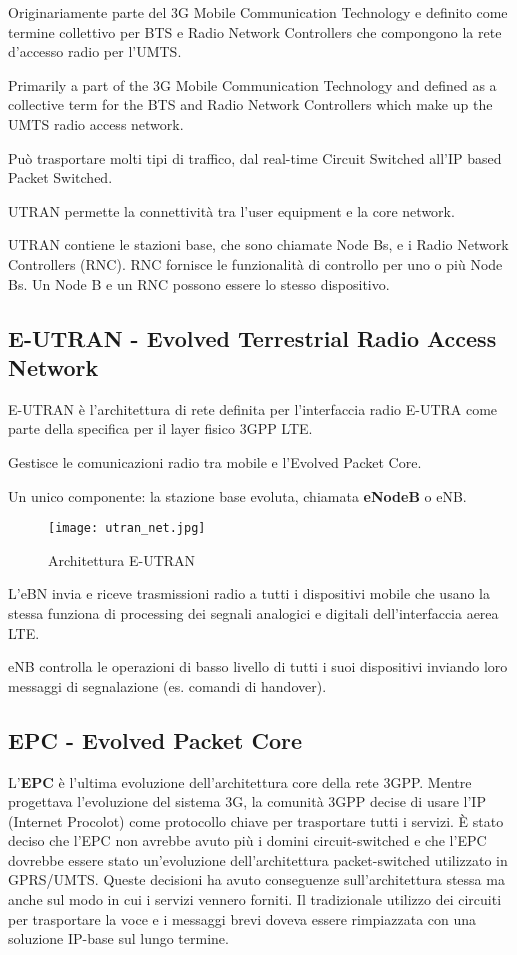 Originariamente parte del 3G Mobile Communication Technology e definito come 
termine collettivo per BTS e Radio Network Controllers che compongono la rete 
d'accesso radio per l'UMTS.

Primarily a part of the 3G Mobile Communication Technology and defined as a
collective term for the BTS and Radio Network Controllers which make up the
UMTS radio access network.

Può trasportare molti tipi di traffico, dal real-time Circuit Switched all'IP 
based Packet Switched.

UTRAN permette la connettività tra l'user equipment e la core network.

UTRAN contiene le stazioni base, che sono chiamate Node Bs, e i Radio
Network Controllers (RNC).
RNC fornisce le funzionalità di controllo per uno o più Node Bs.
Un Node B e un RNC possono essere lo stesso dispositivo.

\subsection{E-UTRAN - Evolved Terrestrial Radio Access Network}

E-UTRAN è l'architettura di rete definita per l'interfaccia radio E-UTRA 
come parte della specifica per il layer fisico 3GPP LTE.

Gestisce le comunicazioni radio tra mobile e l'Evolved Packet Core.

Un unico componente: la stazione base evoluta, chiamata \textbf{eNodeB} o eNB.

\begin{figure}[H]
  \centering
  \texttt{[image: utran\_net.jpg]}
  \caption{Architettura E-UTRAN}
  \label{fig:utran_net}
\end{figure}

L'eBN invia e riceve trasmissioni radio a tutti i dispositivi mobile che usano la 
stessa funziona di processing dei segnali analogici e digitali dell'interfaccia aerea LTE.

eNB controlla le operazioni di basso livello di tutti i suoi dispositivi inviando loro
messaggi di segnalazione (es. comandi di handover).


\subsection{EPC - Evolved Packet Core}

L'\textbf{EPC} è l'ultima evoluzione dell'architettura core della rete 3GPP.
Mentre progettava l'evoluzione del sistema 3G, la comunità 3GPP decise di usare 
l'IP (Internet Procolot) come protocollo chiave per trasportare tutti i servizi.
È stato deciso che l'EPC non avrebbe avuto più i domini circuit-switched e che l'EPC 
dovrebbe essere stato un'evoluzione dell'architettura packet-switched utilizzato 
in GPRS/UMTS.
Queste decisioni ha avuto conseguenze sull'architettura stessa ma anche sul modo in
cui i servizi vennero forniti.
Il tradizionale utilizzo dei circuiti per trasportare la voce e i messaggi brevi 
doveva essere rimpiazzata con una soluzione IP-base sul lungo termine.

